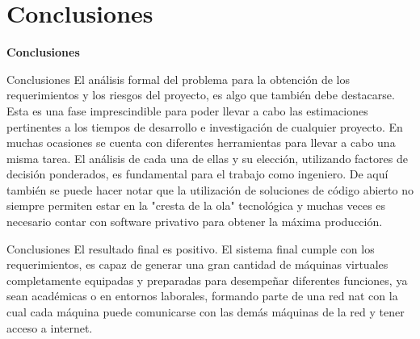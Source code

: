 \section{Conclusiones}
\begin{frame}
    \Huge
    \centering
    \textbf{Conclusiones}

\end{frame}

\begin{frame}{Conclusiones}
    \vspace{0cm}
    El análisis formal del problema para la obtención de los requerimientos y los riesgos del proyecto, es algo que también debe destacarse. Esta es una fase imprescindible para poder llevar a cabo las estimaciones pertinentes a los tiempos de desarrollo e investigación de cualquier proyecto. En muchas ocasiones se cuenta con diferentes herramientas para llevar a cabo una misma tarea. El análisis de cada una de ellas y su elección, utilizando factores de decisión ponderados, es fundamental para el trabajo como ingeniero. De aquí también se puede hacer notar que la utilización de soluciones de código abierto no siempre permiten estar en la "cresta de la ola" tecnológica y muchas veces es necesario contar con software privativo para obtener la máxima producción.

\end{frame}


\begin{frame}{Conclusiones}
    \vspace{-1cm}
    El resultado final es positivo. El sistema final cumple con los requerimientos, es capaz de generar una gran cantidad de máquinas virtuales completamente equipadas y preparadas para desempeñar diferentes funciones, ya sean académicas o en entornos laborales, formando parte de una red nat con la cual cada máquina puede comunicarse con las demás máquinas de la red y tener acceso a internet.

\end{frame}


